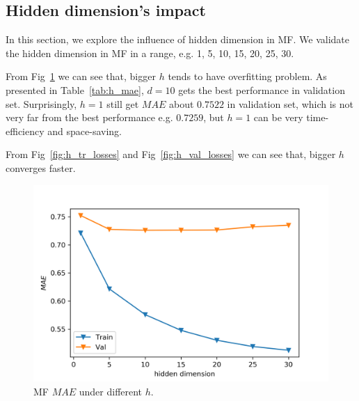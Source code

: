 \documentclass[journal, a4paper]{IEEEtran}
\begin{document}
\subsection{Hidden dimension's impact}
In this section, we explore the influence of hidden dimension in MF. We validate the hidden dimension in MF in a range, e.g. 1, 5, 10, 15, 20, 25, 30. \par 
From Fig~\ref{fig:h_mae} we can see that, bigger $h$ tends to have overfitting problem. As presented in Table~\ref{tab:h_mae}, $d = 10$ gets the best performance in validation set. Surprisingly, $h=1$ still get $MAE$ about $0.7522$ in validation set, which is not very far from the best performance e.g. $0.7259$, but $h=1$ can be very time-efficiency and space-saving.  \par
From Fig~\ref{fig:h_tr_losses} and Fig~\ref{fig:h_val_losses} we can see that, bigger $h$ converges faster. \par
\begin{figure}[!hbt]
	\begin{center}
		\includegraphics[width=\columnwidth]{h_mae}
		\caption{MF $MAE$ under different $h$.}
		\label{fig:h_mae}
	\end{center}
\end{figure} \par
\end{document}
